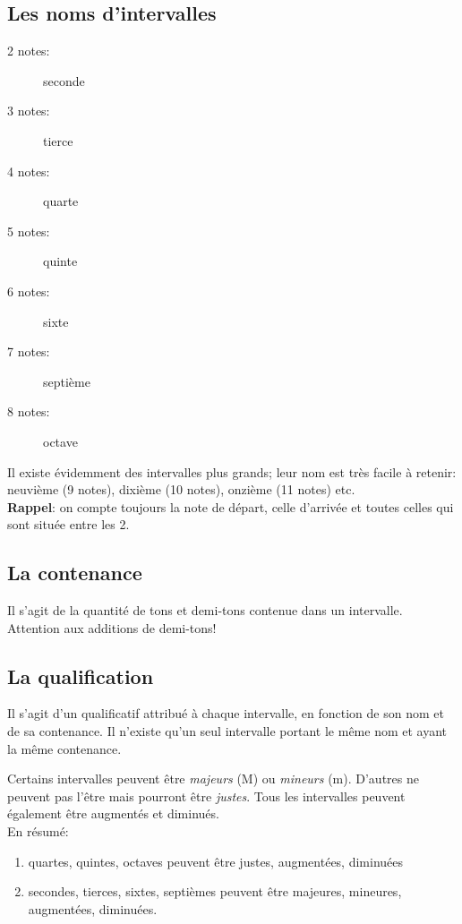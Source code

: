 \documentclass[11pt,a4paper]{scrreprt}
\begin{document}
\subsection{Les noms d'intervalles}
\begin{description}
\item [2 notes:] seconde
\item [3 notes:] tierce
\item [4 notes:] quarte
\item [5 notes:] quinte
\item [6 notes:] sixte
\item [7 notes:] septième
\item [8 notes:] octave
\end{description}
Il existe évidemment des intervalles plus grands; leur nom est très facile à retenir: neuvième (9 notes), dixième (10 notes), onzième (11 notes) etc.\\

\textbf{Rappel}: on compte toujours la note de départ, celle d'arrivée et toutes celles qui sont située entre les 2.
\subsection{La contenance}
Il s'agit de la quantité de tons et demi-tons contenue dans un intervalle. Attention aux additions de demi-tons!

\subsection{La qualification}
Il s'agit d'un qualificatif attribué à chaque intervalle, en fonction de son nom et de sa contenance. Il n'existe qu'un seul intervalle portant le même nom et ayant la même contenance.

Certains intervalles peuvent être \emph{majeurs} (M) ou \emph{mineurs} (m). D'autres ne peuvent pas l'être mais pourront être \emph{justes}. Tous les intervalles peuvent également être augmentés et diminués.\\


En résumé:
\begin{enumerate}
\item quartes, quintes, octaves peuvent être justes, augmentées, diminuées
\item secondes, tierces, sixtes, septièmes peuvent être majeures, mineures, augmentées, diminuées.
\end{enumerate}
\end{document}
